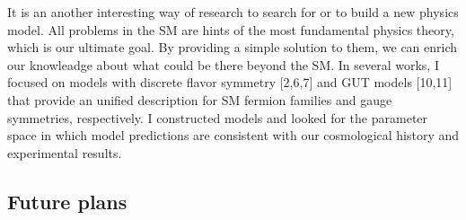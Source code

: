 \documentclass[12pt,notitlepage]{article}
\def\rem#1{ {\bf\textcolor{red}{($\clubsuit$ #1 $\clubsuit$)}}}
\begin{document}

It is an another interesting way of research to search for or to build a new physics model.
All problems in the SM are hints of the most fundamental physics theory, which is our ultimate goal.
By providing a simple solution to them, we can enrich our knowleadge about what could be there beyond the SM.
In several works, I focused on models with discrete flavor symmetry [2,6,7] and GUT models [10,11] that provide an unified description for SM fermion families and gauge symmetries, respectively.
I constructed models and looked for the parameter space in which model predictions are consistent with our cosmological history and experimental results.




\vspace*{-2mm}
\subsection*{Future plans}
\end{document}
